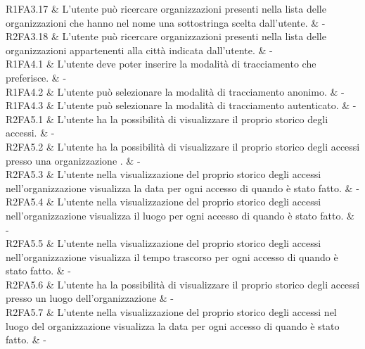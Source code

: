 R1FA3.17 & L’utente può ricercare organizzazioni presenti nella lista delle organizzazioni che hanno nel nome una sottostringa scelta dall'utente.  & - \\

R2FA3.18 & L’utente può ricercare organizzazioni presenti nella lista delle organizzazioni appartenenti alla città indicata dall’utente.  & - \\

R1FA4.1 & L’utente deve poter inserire la modalità di tracciamento che preferisce. & - \\

R1FA4.2 & L’utente può selezionare la modalità di tracciamento anonimo. & - \\

R1FA4.3 & L’utente può selezionare la modalità di tracciamento autenticato. & - \\

R2FA5.1 & L’utente ha la possibilità di visualizzare il proprio storico degli accessi.  & - \\

R2FA5.2 & L’utente ha la possibilità di visualizzare il proprio storico degli accessi presso una organizzazione .  & - \\

R2FA5.3 & L'utente nella visualizzazione del proprio storico degli accessi nell'organizzazione visualizza la data per ogni accesso di quando è stato fatto. & - \\

R2FA5.4 & L'utente nella visualizzazione del proprio storico degli accessi nell'organizzazione visualizza il luogo per ogni accesso di quando è stato fatto.  & - \\

R2FA5.5 & L'utente nella visualizzazione del proprio storico degli accessi nell'organizzazione visualizza il tempo trascorso per ogni accesso di quando è stato fatto.  & - \\

R2FA5.6 & L’utente ha la possibilità di visualizzare il proprio storico degli accessi presso un luogo dell’organizzazione & - \\

R2FA5.7 & L'utente nella visualizzazione del proprio storico degli accessi nel luogo del organizzazione visualizza la data per ogni accesso di quando è stato fatto.  & - \\

